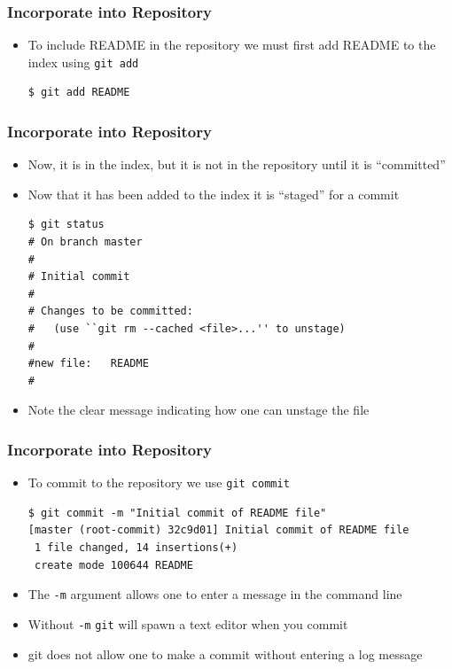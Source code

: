 \documentclass[handout,13pt,compress,c]{beamer}
\newcommand{\bi}{\begin{itemize}}
\newcommand{\ei}{\end{itemize}}
\begin{document}
\begin{frame}[fragile]
\frametitle{Incorporate into Repository}
\bi
\item To include README in the repository we must first add README to the index using \texttt{git add}
\begin{semiverbatim}
\begin{lstlisting}
$ git add README
\end{lstlisting}
\end{semiverbatim}
\ei
\end{frame}
\begin{frame}[fragile]
\frametitle{Incorporate into Repository}
\bi
\item Now, it is in the index, but it is not in the repository until it is ``committed''
\item Now that it has been added to the index it is ``staged'' for a commit
\begin{semiverbatim}
\begin{lstlisting}
$ git status
# On branch master
#
# Initial commit
#
# Changes to be committed:
#   (use ``git rm --cached <file>...'' to unstage)
#
#new file:   README
#
\end{lstlisting}
\end{semiverbatim}
\item Note the clear message indicating how one can unstage the file
\ei
\end{frame}
\begin{frame}[fragile]
\frametitle{Incorporate into Repository}
\bi
\item To commit to the repository we use \texttt{git commit}
\begin{semiverbatim}
\begin{lstlisting}
$ git commit -m "Initial commit of README file"
[master (root-commit) 32c9d01] Initial commit of README file
 1 file changed, 14 insertions(+)
 create mode 100644 README
\end{lstlisting}
\end{semiverbatim}
\item The \texttt{-m} argument allows one to enter a message in the command line
\item Without \texttt{-m} \texttt{git} will spawn a text editor when you commit
\item git does not allow one to make a commit without entering a log message
\ei
\end{frame}
\end{document}
